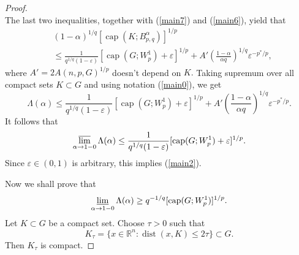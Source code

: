 \documentclass[12pt,twoside,reqno]{amsart}
\numberwithin{equation}{section}
\theoremstyle{definition}
\numberwithin{equation}{section}
\begin{document}
\begin{proof}
$$$$
The last two inequalities, together with (\ref{main7}) and (\ref{main6}), yield that
$$
\begin{aligned}
&(1-{\alpha})^{1/q}[{\operatorname{cap}}\left(K;B_{p,q}^{\alpha}\right)]^{1/p}\\
&\le \frac1{q^{1/q}(1-{\varepsilon})}[{\operatorname{cap}}(G;W_p^1)+{\varepsilon}]^{1/p}+ A'\left(\frac{1-{\alpha}}{{\alpha} q}\right)^{1/q}{\varepsilon}^{-p^*/p},
\end{aligned}
$$
where $A'=2A(n,p,G)^{1/p}$ doesn't depend on $K.$ Taking
supremum over all compact sets $K\subset G$ and using notation
(\ref{main0}), we get
$$
\Lambda({\alpha})\le\frac{1}{q^{1/q}(1-{\varepsilon})}[{\operatorname{cap}}(G;W_p^1)+{\varepsilon}]^{1/p}+ A'\left(\frac{1-{\alpha}}{{\alpha} q}\right)^{1/q}{\varepsilon}^{-p^*/p}.
$$
It follows that
$$
\varlimsup_{{\alpha}\to 1-0}\Lambda({\alpha})\le \frac{1}{q^{1/q}(1-{\varepsilon})}[{\operatorname{cap}}(G;W_p^1)+{\varepsilon}]^{1/p}.
$$
Since ${\varepsilon}\in(0,1)$ is arbitrary, this implies (\ref{main2}).

Now we shall prove that
\begin{equation}\label{main8}
\varliminf_{{\alpha}\to 1-0}\Lambda({\alpha})\ge q^{-1/q}[{\operatorname{cap}}(G;W_p^1)]^{1/p}.
\end{equation}
Let $K\subset G$ be a compact set. Choose $\tau>0$ such that
\begin{equation}\label{main9}
K_\tau=\{x\in {\mathbb{R}}^n: {\operatorname{dist}}(x, K)\le 2\tau\}\subset G.
\end{equation}
Then $K_\tau$ is compact.


\end{proof}
\end{document}
